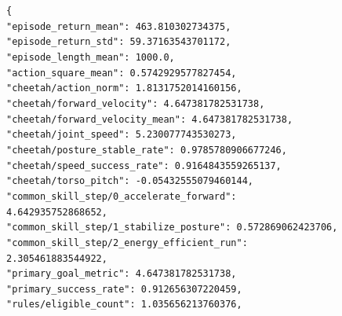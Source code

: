 \documentclass[conference,letterpaper,10pt]{IEEEtran}
\begin{document}
\begin{figure}[!t]
{\begin{minipage}{0.94\textwidth}
\texttt{\{}\\
\texttt{\hspace*{1em}"episode\_return\_mean": 463.810302734375,}\\
\texttt{\hspace*{1em}"episode\_return\_std": 59.37163543701172,}\\
\texttt{\hspace*{1em}"episode\_length\_mean": 1000.0,}\\
\texttt{\hspace*{1em}"action\_square\_mean": 0.5742929577827454,}\\
\texttt{\hspace*{1em}"cheetah/action\_norm": 1.8131752014160156,}\\
\texttt{\hspace*{1em}"cheetah/forward\_velocity": 4.647381782531738,}\\
\texttt{\hspace*{1em}"cheetah/forward\_velocity\_mean": 4.647381782531738,}\\
\texttt{\hspace*{1em}"cheetah/joint\_speed": 5.230077743530273,}\\
\texttt{\hspace*{1em}"cheetah/posture\_stable\_rate": 0.9785780906677246,}\\
\texttt{\hspace*{1em}"cheetah/speed\_success\_rate": 0.9164843559265137,}\\
\texttt{\hspace*{1em}"cheetah/torso\_pitch": -0.05432555079460144,}\\
\texttt{\hspace*{1em}"common\_skill\_step/0\_accelerate\_forward": 4.642935752868652,}\\
\texttt{\hspace*{1em}"common\_skill\_step/1\_stabilize\_posture": 0.572869062423706,}\\
\texttt{\hspace*{1em}"common\_skill\_step/2\_energy\_efficient\_run": 2.305461883544922,}\\
\texttt{\hspace*{1em}"primary\_goal\_metric": 4.647381782531738,}\\
\texttt{\hspace*{1em}"primary\_success\_rate": 0.912656307220459,}\\
\texttt{\hspace*{1em}"rules/eligible\_count": 1.035656213760376,}\\

\end{minipage}}
\end{figure}
\end{document}
